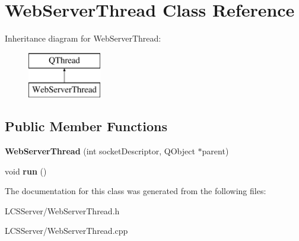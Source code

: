 \hypertarget{class_web_server_thread}{}\section{Web\+Server\+Thread Class Reference}
\label{class_web_server_thread}
Inheritance diagram for Web\+Server\+Thread\+:\begin{figure}[H]
\begin{center}
\leavevmode
\includegraphics[height=2.000000cm]{class_web_server_thread}
\end{center}
\end{figure}
\subsection*{Public Member Functions}
\begin{DoxyCompactItemize}
\item 
\mbox{\label{class_web_server_thread_a8e66279390f71cac5263689b4fc60c23}} 
{\bfseries Web\+Server\+Thread} (int socket\+Descriptor, Q\+Object $\ast$parent)
\item 
\mbox{\label{class_web_server_thread_a301c2ed6e2d0c9a020089862e20b7da6}} 
void {\bfseries run} ()
\end{DoxyCompactItemize}


The documentation for this class was generated from the following files\+:\begin{DoxyCompactItemize}
\item 
L\+C\+S\+Server/Web\+Server\+Thread.\+h\item 
L\+C\+S\+Server/Web\+Server\+Thread.\+cpp\end{DoxyCompactItemize}
